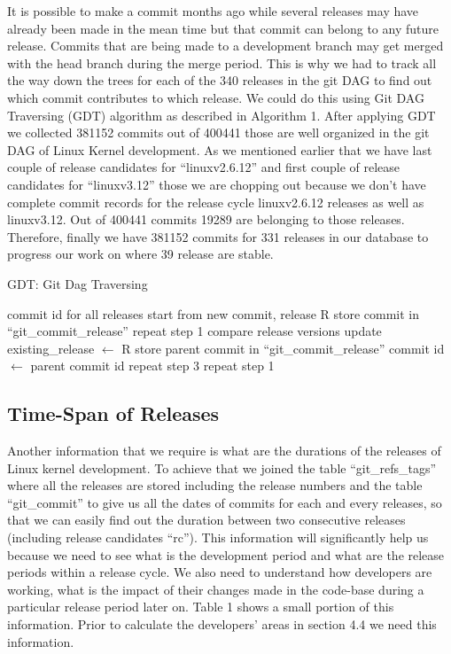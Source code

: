 \documentclass{acm_proc_article-sp}
\begin{document}
It is possible to make a commit months ago while several releases may have already been made in the mean time but that commit can belong to any future release. Commits that are being made to a development branch may get merged with the head branch during the merge period. This is why we had to track all the way down the trees for each of the 340 releases in the git DAG to find out which commit contributes to which release. We could do this using Git DAG Traversing (GDT) algorithm as described in Algorithm 1. After applying GDT we collected 381152 commits out of 400441 those are well organized in the git DAG of Linux Kernel development. As we mentioned earlier that we have last couple of release candidates for ``linuxv2.6.12'' and first couple of release candidates for ``linuxv3.12'' those we are chopping out because we don't have complete commit records for the release cycle linuxv2.6.12 releases as well as linuxv3.12. Out of 400441 commits 19289 are belonging to those releases. Therefore, finally we have 381152 commits for 331 releases in our database to progress our work on where 39 release are stable.
\begin{algorithm}
\caption{GDT: Git Dag Traversing}
\begin{algorithmic}[1]
\REQUIRE
\STATE commit id for all releases
\ENSURE
{}
\STATE start from new commit, release R
\STATE store commit in ``git\_commit\_release''
			\STATE repeat step 1
			\STATE compare release versions
				\STATE update existing\_release $\gets$ R
			\ENDIF
		\ELSE
			\STATE store parent commit in ``git\_commit\_release''
			\STATE commit id $\gets$ parent commit id
			\STATE repeat step 3
		\ENDIF
	\ENDFOR
{}
	\STATE repeat step 1
\ENDIF
\ENDFOR
\end{algorithmic}
\end{algorithm}
\subsection{Time-Span of Releases}
Another information that we require is what are the durations of the releases of Linux kernel development. To achieve that we joined the table ``git\_refs\_tags'' where all the releases are stored including the release numbers and the table ``git\_commit'' to give us all the dates of commits for each and every releases, so that we can easily find out the duration between two consecutive releases (including release candidates ``rc''). This information will significantly help us because we need to see what is the development period and what are the release periods within a release cycle. We also need to understand how developers are working, what is the impact of their changes made in the code-base during a particular release period later on. Table 1 shows a small portion of this information. Prior to calculate the developers' areas in section 4.4 we need this information.
\end{document}
